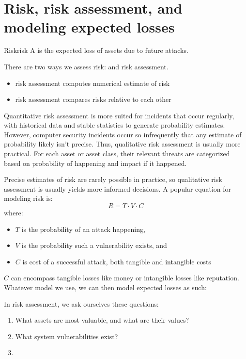 \documentclass[12pt]{report}
\begin{document}
\section{Risk, risk assessment, and modeling expected losses}

\begin{dfnbox}{Risk}{risk}
    A  is the expected loss of assets due to future attacks.
\end{dfnbox}

There are two ways we assess risk:  and  risk assessment.
\begin{itemize}
    \item {} risk assessment computes numerical estimate of risk
    \item {} risk assessment compares risks relative to each other
\end{itemize}

Quantitative risk assessment is more suited for incidents that occur regularly, with historical data and stable statistics to generate probability estimates. However, computer security incidents occur so infrequently that any estimate of probability likely isn't precise. Thus, qualitative risk assessment is usually more practical. For each asset or asset class, their relevant threats are categorized based on probability of happening and impact if it happened.

Precise estimates of risk are rarely possible in practice, so qualitative risk assessment is usually yields more informed decisions. A popular equation for modeling risk is:
\[ R = T \cdot V \cdot C \]
where:
\begin{itemize}
    \item $T$ is the probability of an attack happening,
    \item $V$ is the probability such a vulnerability exists, and
    \item $C$ is cost of a successful attack, both tangible and intangible costs
\end{itemize}

$C$ can encompass tangible losses like money or intangible losses like reputation. Whatever model we use, we can then model expected losses as such:

In risk assessment, we ask ourselves these questions:
\begin{enumerate}
    \item What assets are most valuable, and what are their values?
    \item What system vulnerabilities exist?
    \item
\end{enumerate}
\end{document}
